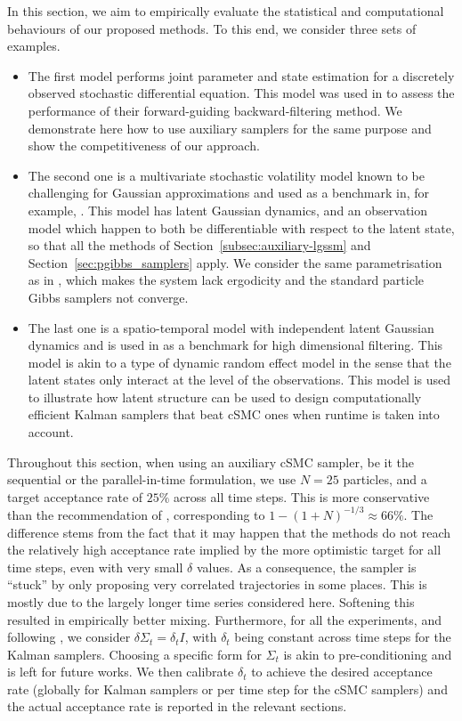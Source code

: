 In this section, we aim to empirically evaluate the statistical and computational behaviours of our proposed methods. To this end, we consider three sets of examples.
\begin{itemize}
    \item The first model performs joint parameter and state estimation for a discretely observed stochastic differential equation. This model was used in \citet{mider2021continuous} to assess the performance of their forward-guiding backward-filtering method. We demonstrate here how to use auxiliary samplers for the same purpose and show the competitiveness of our approach.
    \item The second one is a multivariate stochastic volatility model known to be challenging for Gaussian approximations and used as a benchmark in, for example, \citet{guarniero2017iterated,finke2021csmc}. This model has latent Gaussian dynamics, and an observation model which happen to both be differentiable with respect to the latent state, so that all the methods of Section~\ref{subsec:auxiliary-lgssm} and Section~\ref{sec:pgibbs_samplers} apply. We consider the same parametrisation as in \citet{finke2021csmc}, which makes the system lack ergodicity and the standard particle Gibbs samplers not converge.
    \item The last one is a spatio-temporal model with independent latent Gaussian dynamics and is used in \citet{cruscino2022highdim} as a benchmark for high dimensional filtering. This model is akin to a type of dynamic random effect model in the sense that the latent states only interact at the level of the observations. This model is used to illustrate how latent structure can be used to design computationally efficient Kalman samplers that beat cSMC ones when runtime is taken into account.
\end{itemize}


Throughout this section, when using an auxiliary cSMC sampler, be it the sequential or the parallel-in-time formulation, we use $N=25$ particles, and a target acceptance rate of $25\%$ across all time steps. This is more conservative than the recommendation of \citet{finke2021csmc}, corresponding to $1 - (1 + N)^{-1/3}\approx 66\%$. The difference stems from the fact that it may happen that the methods do not reach the relatively high acceptance rate implied by the more optimistic target for all time steps, even with very small $\delta$ values. As a consequence, the sampler is ``stuck'' by only proposing very correlated trajectories in some places. This is mostly due to the largely longer time series considered here. Softening this resulted in empirically better mixing. Furthermore, for all the experiments, and following \citet[][]{titsias2018,finke2021csmc}, we consider $\delta \Sigma_t = \delta_t I$, with $\delta_t$ being constant across time steps for the Kalman samplers. Choosing a specific form for $\Sigma_t$ is akin to pre-conditioning and is left for future works. We then calibrate $\delta_t$ to achieve the desired acceptance rate (globally for Kalman samplers or per time step for the cSMC samplers) and the actual acceptance rate is reported in the relevant sections.

